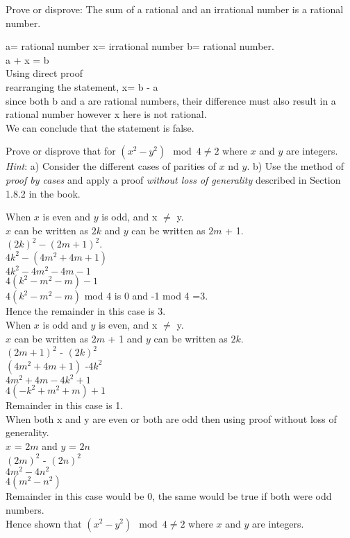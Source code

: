 \documentclass[a4paper]{exam}
\theoremstyle{definition}
\begin{document}
\begin{questions}
\question Prove or disprove: The sum of a rational and an irrational number is a rational number.

  \begin{solution}
    a= rational number x= irrational number b= rational number.\\
    a + x = b\\
    Using direct proof\\
    rearranging the statement, x= b - a\\
    since both b and a are rational numbers, their difference must also result in a rational number however x here is not rational.\\
    We can conclude that the statement is false.
    \end{solution}
  
\question Prove or disprove that for $(x^2 - y^2) \mod 4 \neq 2$ where $x$ and $y$ are integers.\\
  \textit{Hint}: a) Consider the different cases of parities of $x$ nd $y$. b) Use the method of \textit{proof by cases} and apply a proof \textit{without loss of generality} described in Section 1.8.2 in the book.

  \begin{solution}
   
    When $x$ is even and $y$ is odd, and x $\neq$ y.\\
    $x$ can be written as $2k$ and $y$ can be written as $2m$ + 1.\\
    $(2k)^2 - (2m + 1)^2$.\\
    $4k^2 - (4m^2 + 4m + 1)$\\
    $4k^2 -4m^2 - 4m - 1$\\
    $4(k^2 -m^2 - m) - 1$\\
    $4(k^2 -m^2 - m)$ mod 4 is 0 and -1 mod 4 =3.\\
    Hence the remainder in this case is 3.\\
     When $x$ is odd and $y$ is even, and x $\neq$ y.\\
      $x$ can be written as $2m$ + 1 and $y$ can be written as $2k$.\\
     $(2m + 1)^2$ -  $(2k)^2$\\
     $(4m^2 + 4m + 1)$ -$4k^2$\\
     $4m^2 + 4m -4k^2 + 1 $\\
    $4(-k^2 +m^2 + m) + 1$\\
    Remainder in this case is 1.\\
    When both x and y are even or both are odd then using proof without loss of generality.\\
    $x$ = 2$m$ and $y$ = $2n$\\
    $(2m)^2$ - $(2n)^2$\\
    $4m^2 - 4n^2$\\
    $4(m^2 - n^2)$\\
    Remainder in this case would be 0, the same would be true if both were odd numbers.\\
    Hence shown that  $(x^2 - y^2) \mod 4 \neq 2$ where $x$ and $y$ are integers.
    

\end{solution}
\end{questions}
\end{document}
